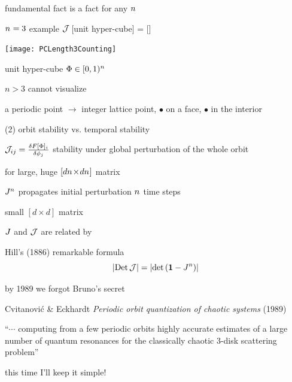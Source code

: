 \begin{frame}{fundamental fact is a fact for any ${n_{}}$}

    \begin{block}{${n_{}}=3$ example} %
${\cal J}\,$[unit hyper-cube] = [{\fundPip}]
\begin{center}
            \begin{minipage}[c]{0.32\textwidth}\begin{center}
\texttt{[image: PCLength3Counting]}
            \end{center}\end{minipage}
            \hspace{2ex}
            \begin{minipage}[c]{0.46\textwidth}
unit hyper-cube $\Phi\in[0,1)^{n_{}}$
\bigskip\bigskip

{\footnotesize $n>3$ cannot visualize}
            \end{minipage}
\end{center}
    \end{block}
    {\footnotesize
a periodic point $\rightarrow$ integer lattice point,
{\color{red}$\bullet$} on a face,
{\color{blue}$\bullet$} in the interior
    }
\end{frame}

\begin{frame}{(2) orbit stability vs. temporal stability}
\begin{block}{\jacobianOrb}
\(
{\cal J}_{ij} =\frac{\delta F[\Phi]_i}{\delta \phi_j}
\)
stability under {\color{blue}global} perturbation of the whole orbit

\hfill for \cl{} large, huge $[d{n_{}}\!\times\!d{n_{}}]$ matrix
\end{block}
\begin{block}{{\jacobianM}}
\(
J^n
\)
propagates {\color{blue}initial} perturbation ${n_{}}$ time steps

\hfill small $[d\!\times\!d]$ matrix
\end{block}
\vfill

$J$ and ${\cal J}$ are related by
\begin{block}{Hill's (1886) remarkable formula}
\[
|\mbox{\rm Det}\,{\cal J}| = |\mbox{\rm det}\,({\bf 1} - J^n)|
\]
\end{block}
\end{frame}

\begin{frame}{by 1989 we forgot Bruno's secret}
\vfill

Cvitanovi\'c \& Eckhardt
{\em Periodic orbit quantization of chaotic systems}
(1989)
\bigskip

``$\cdots$ computing from a few periodic orbits highly accurate estimates
of a large number of quantum resonances for the classically chaotic
3-disk scattering problem''

\vfill

\begin{center}
{\Large this time I'll keep it simple!}
\end{center}

\end{frame}

